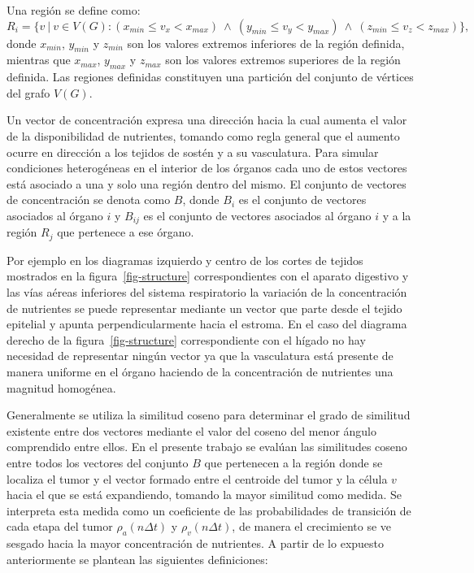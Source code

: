 \begin{definition}
\label{def-regions}
Una regi\'on se define como:
\begin{equation}
R_i = \lbrace v~|~v \in V(G) : (x_{min} \leq v_x < x_{max})~\wedge~(y_{min} \leq v_y < y_{max}) ~\wedge~(z_{min} \leq v_z < z_{max}) \rbrace,
\end{equation}
donde $x_{min}$, $y_{min}$ y $z_{min}$ son los valores extremos inferiores de la regi\'on definida, mientras que $x_{max}$, $y_{max}$ y $z_{max}$ son los valores extremos superiores de la regi\'on definida. Las regiones definidas constituyen una partici\'on del conjunto de v\'ertices del grafo $V(G)$.
\end{definition}

\begin{definition}
\label{def-concentration}
Un vector de concentraci\'on expresa una direcci\'on hacia la cual aumenta el valor de la disponibilidad de nutrientes, tomando como regla general que el aumento ocurre en direcci\'on a los tejidos de sost\'en y a su vasculatura. Para simular condiciones heterog\'eneas en el interior de los \'organos cada uno de estos vectores est\'a asociado a una y solo una regi\'on dentro del mismo. El conjunto de vectores de concentraci\'on se denota como $B$, donde $B_i$ es el conjunto de vectores asociados al \'organo $i$ y $B_{ij}$ es el conjunto de vectores asociados al \'organo $i$ y a la regi\'on $R_j$ que pertenece a ese \'organo. 
\end{definition}

Por ejemplo en los diagramas izquierdo y centro de los cortes de tejidos mostrados en la figura~\ref{fig-structure} correspondientes con el aparato digestivo y las v\'ias a\'ereas inferiores del sistema respiratorio la variaci\'on de la concentraci\'on de nutrientes se puede representar mediante un vector que parte desde el tejido epitelial y apunta perpendicularmente hacia el estroma. En el caso del diagrama derecho de la figura~\ref{fig-structure} correspondiente con el h\'igado no hay necesidad de representar ning\'un vector ya que la vasculatura est\'a presente de manera uniforme en el \'organo haciendo de la concentraci\'on de nutrientes una magnitud homog\'enea. 

Generalmente se utiliza la similitud coseno para determinar el grado de similitud existente entre dos vectores mediante el valor del coseno del menor \'angulo comprendido entre ellos. En el presente trabajo se eval\'uan las similitudes coseno entre todos los vectores del conjunto $B$ que pertenecen a la regi\'on donde se localiza el tumor y el vector formado entre el centroide del tumor y la c\'elula $v$ hacia el que se est\'a expandiendo, tomando la mayor similitud como medida. Se interpreta esta medida como un coeficiente de las probabilidades de transici\'on de cada etapa del tumor $\rho_a(n \Delta t)$ y $\rho_v(n \Delta t)$, de manera el crecimiento se ve sesgado hacia la mayor concentraci\'on de nutrientes. A partir de lo expuesto anteriormente se plantean las siguientes definiciones:

